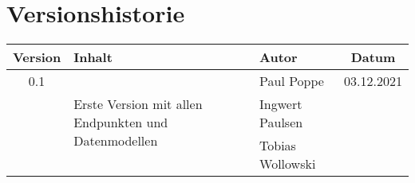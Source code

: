 \chapter*{Versionshistorie}
\begin{table}[htb]
	\begin{tabularx}{\textwidth}{|c|X|l|c|}
		\hline
\textbf{Version} & \textbf{Inhalt} & \textbf{Autor} & \textbf{Datum} \\ \hline
0.1 & \multirow[t]{3}{=}{Erste Version mit allen Endpunkten und Datenmodellen} & Paul Poppe & 03.12.2021 \\
 & & Ingwert Paulsen &  \\
 & & Tobias Wollowski &  \\ \hline
	\end{tabularx}
\end{table}
